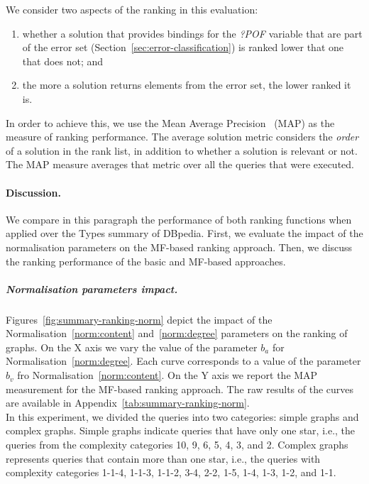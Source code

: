 We consider two aspects of the ranking in this evaluation:
\begin{enumerate}
	\item whether a solution that provides bindings for the \emph{?POF} variable that are part of the error set (Section~\ref{sec:error-classification}) is ranked lower that one that does not; and
	\item the more a solution returns elements from the error set, the lower ranked it is.
\end{enumerate}
In order to achieve this, we use the Mean Average Precision~\cite{manning:2008:iir} (MAP) as the measure of ranking performance.
The average solution metric considers the \emph{order} of a solution in the rank list, in addition to whether a solution is relevant or not.
The MAP measure averages that metric over all the queries that were executed.

\paragraph{Discussion.}

We compare in this paragraph the performance of both ranking functions when applied over the Types summary of DBpedia. First, we evaluate the impact of the normalisation parameters on the MF-based ranking approach. Then, we discuss the ranking performance of the basic and MF-based approaches.

\subparagraph{Normalisation parameters impact.}

Figures~\ref{fig:summary-ranking-norm} depict the impact of the Normalisation~\ref{norm:content} and~\ref{norm:degree} parameters on the ranking of graphs. On the X axis we vary the value of the parameter $b_a$ for Normalisation~\ref{norm:degree}. Each curve corresponds to a value of the parameter $b_v$ fro Normalisation~\ref{norm:content}. On the Y axis we report the MAP measurement for the MF-based ranking approach. The raw results of the curves are available in Appendix~\ref{tab:summary-ranking-norm}.\\

In this experiment, we divided the queries into two categories: simple graphs and complex graphs. Simple graphs indicate queries that have only one star, i.e., the queries from the complexity categories 10, 9, 6, 5, 4, 3, and 2. Complex graphs represents queries that contain more than one star, i.e., the queries with complexity categories 1-1-4, 1-1-3, 1-1-2, 3-4, 2-2, 1-5, 1-4, 1-3, 1-2, and 1-1.

